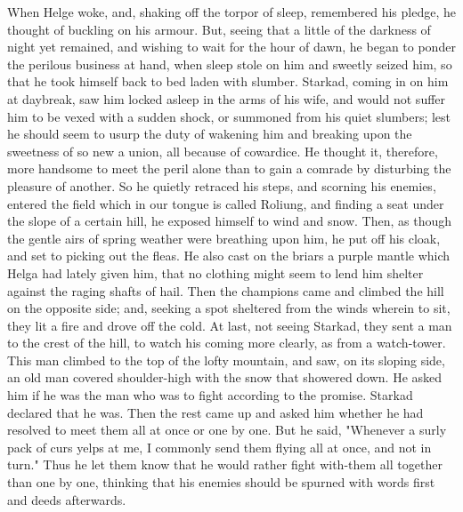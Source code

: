 \documentclass[10pt,a4paper]{report}
\begin{document}
When Helge woke, and, shaking off the torpor of sleep, remembered his pledge, he thought of buckling on his armour. But, seeing that a little of the darkness of night yet remained, and wishing to wait for the hour of dawn, he began to ponder the perilous business at hand, when sleep stole on him and sweetly seized him, so that he took himself back to bed laden with slumber. Starkad, coming in on him at daybreak, saw him locked asleep in the arms of his wife, and would not suffer him to be vexed with a sudden shock, or summoned from his quiet slumbers; lest he should seem to usurp the duty of wakening him and breaking upon the sweetness of so new a union, all because of cowardice. He thought it, therefore, more handsome to meet the peril alone than to gain a comrade by disturbing the pleasure of another. So he quietly retraced his steps, and scorning his enemies, entered the field which in our tongue is called Roliung, and finding a seat under the slope of a certain hill, he exposed himself to wind and snow. Then, as though the gentle airs of spring weather were breathing upon him, he put off his cloak, and set to picking out the fleas. He also cast on the briars a purple mantle which Helga had lately given him, that no clothing might seem to lend him shelter against the raging shafts of hail. Then the champions came and climbed the hill on the opposite side; and, seeking a spot sheltered from the winds wherein to sit, they lit a fire and drove off the cold. At last, not seeing Starkad, they sent a man to the crest of the hill, to watch his coming more clearly, as from a watch-tower. This man climbed to the top of the lofty mountain, and saw, on its sloping side, an old man covered shoulder-high with the snow that showered down. He asked him if he was the man who was to fight according to the promise. Starkad declared that he was. Then the rest came up and asked him whether he had resolved to meet them all at once or one by one. But he said, "Whenever a surly pack of curs yelps at me, I commonly send them flying all at once, and not in turn." Thus he let them know that he would rather fight with-them all together than one by one, thinking that his enemies should be spurned with words first and deeds afterwards.\\
\end{document}
